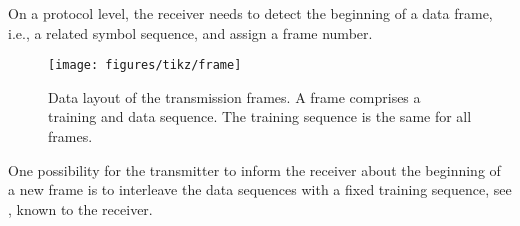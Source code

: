 On a protocol level, the receiver needs to detect the beginning of a data frame, i.e., a related symbol sequence, and assign a frame number.
\begin{figure}[htb]
	\centering
	\texttt{[image: figures/tikz/frame]}
	\caption{Data layout of the transmission frames. A frame comprises a training and data sequence. The training sequence is the same for all frames.}\label{fig:frame}
\end{figure}
One possibility for the transmitter to inform the receiver about the beginning of a new frame is to interleave the data sequences with a fixed training sequence, see , known to the receiver.